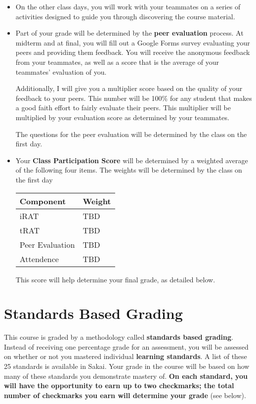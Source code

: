 \documentclass[letterpaper]{article}
\begin{document}
{\begin{itemize}
\item On the other class days, you will work with your teammates on a series of activities designed to guide you through discovering the course material.

\item Part of your grade will be determined by the {\bf peer evaluation} process.  At midterm and at final, you will fill out a Google Forms survey evaluating your peers and providing them feedback.  You will receive the anonymous feedback from your teammates, as well as a score that is the average of your teammates' evaluation of you.

Additionally, I will give you a multiplier score based on the quality of your feedback to your peers.  This number will be 100\% for any student that makes a good faith effort to fairly evaluate their peers.  This multiplier will be multiplied by your evaluation score as determined by your teammates. 

The questions for the peer evaluation will be determined by the class on the first day. 

\item Your {\bf Class Participation Score} will be determined by a weighted average of the following four items.  The weights will be determined by the class on the first day

\begin{center}
\begin{tabular}{l|l}
Component & Weight \\ \hline \hline 
iRAT & TBD \\ \hline
tRAT & TBD\\ \hline
Peer Evaluation & TBD \\ \hline
Attendence & TBD\\ \hline

\end{tabular}
\end{center}

This score will help determine your final grade, as detailed below.
\end{itemize}
}

\section*{\fontsize{12}{15}\selectfont Standards Based Grading}
This course is graded by a methodology called {\bf standards based grading}.  Instead of receiving one percentage grade for an assessment, you will be assessed on whether or not you mastered individual {\bf learning standards}.  A list of these 25 standards is available in Sakai.  Your grade in the course will be based on how many of these standards you demonstrate mastery of.  {\bf On each standard, you will have the opportunity to earn up to two checkmarks; the total number of checkmarks you earn will determine your grade} (see below).
 
\end{document}
